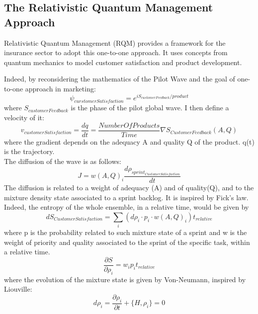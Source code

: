 \documentclass{article}
\begin{document}
\subsection{The Relativistic Quantum Management Approach}
Relativistic Quantum Management (RQM) provides a framework for the insurance sector to adopt this one-to-one approach. It uses concepts from quantum mechanics to model customer satisfaction and product development.

Indeed, by reconsidering the mathematics of the Pilot Wave and the goal of one-to-one approach in marketing:
\begin{equation}
    \psi_{curstomerSatisfaction} = e^{iS_{customerFeedback}/product}
\end{equation}
where $S_{customerFeedback}$ is the phase of the pilot global wave.
I then define a velocity of it:
\begin{equation}
   v_{customerSatisfaction} =  \frac{dq}{dt} =  \frac{NumberOfProducts}{Time} \nabla{S_{CustomerFeedback}(A,Q)}
\end{equation}
where the gradient depends on the adequacy A and quality Q of the product. q(t) is the trajectory.\\
The diffusion of the wave is as follows:
\begin{equation}
    J = w(A, Q)_i \frac{d \rho_{sprint_{CustomerSatisfaction}}}{dt}
\end{equation}
The diffusion is related to a weight of adequacy (A) and of quality(Q), and to the mixture density state associated to a sprint backlog. It is inspired by Fick's law.\\
Indeed, the entropy of the whole ensemble, in a relative time, would be given by
\begin{equation}
    dS_{CustomerSatisfaction} = \sum_i (d\rho_i \cdot p_i \cdot w(A, Q)_i) t_{relative}
\end{equation}
where p is the probability related to such mixture state of a sprint and w is the weight of priority and quality associated to the sprint of the specific task, within a relative time.\\
\begin{equation}
    \frac{\partial S}{\partial \rho_i} = w_i p_i t_{relative}
\end{equation}
where the evolution of the mixture state is given by Von-Neumann, inspired by Liouville:
\begin{equation}
    d\rho_i = \frac{\partial{\rho_i}}{\partial t} + \{H, \rho_i\} =0
\end{equation}
\end{document}
